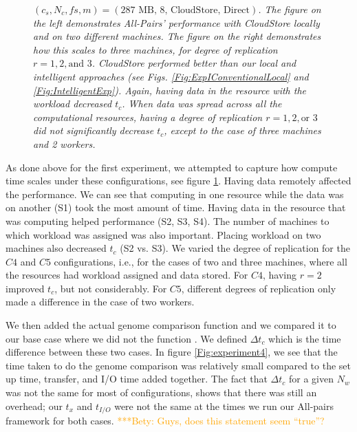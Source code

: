 \documentclass{rspublic}
\newcommand{\micnote}[1]{ {\textcolor{blue} { ***Michael: #1 }}}
\newcommand{\betynote}[1]{ {\textcolor{orange} { ***Bety: #1 }}}
\newcommand{\jhanote}[1]{} \newcommand{\micnote}[1]{}\newcommand{\betynote}[1]{} \newcommand{\fixme}[1]{}
\begin{document}
\begin{figure}
\begin{center}
{\label{Fig:experiment3:b}
}
\caption{\textit{$(c_s, N_c, fs, m) = (\mbox{287 MB, 8, CloudStore,
Direct})$. The figure on the left demonstrates All-Pairs' performance
with CloudStore locally and on two different machines. The figure on the
right demonstrates how this scales to three machines, for degree of
replication $r=1,2,\mbox{and } 3$. CloudStore performed better than our
local and intelligent approaches (see Figs.
\ref{Fig:ExpIConventionalLocal} and \ref{Fig:IntelligentExp}). Again,
having data in the resource with the workload decreased $t_c$. When data
was spread across all the computational resources, having a degree of
replication $r = 1, 2, \mbox{or } 3$ did not significantly decrease
$t_c$, except to the case of three machines and 2 workers.}
\jhanote{This caption needs attention}}
\label{Fig:experiment3}
\end{center}
\end{figure}


As done above for the first experiment, we attempted to capture how
compute time scales under these configurations, see figure
\ref{Fig:experiment3}. Having data remotely affected the performance. We
can see that computing in one resource while the data was on another
(S1) took the most amount of time. Having data in the resource that was
computing helped performance (S2, S3, S4). The number of machines to
which workload was assigned was also important. Placing workload on two
machines also decreased $t_c$ (S2 vs. S3). We varied the degree of
replication for the $C4$ and $C5$ configurations, i.e., for the cases of
two and three machines, where all the resources had workload assigned
and data stored. For $C4$, having $r = 2$ improved $t_c$, but not
considerably. For $C5$, different degrees of replication only made a
difference in the case of two workers.

We then added the actual genome comparison function and we compared it
to our base case where we did not the function . We defined $\Delta t_c$
which is the time difference between these two cases. In figure
\ref{Fig:experiment4}, we see that the time taken to do the genome
comparison was relatively small compared to the set up time, transfer,
and I/O time added together. The fact that $\Delta t_c$ for a given
$N_w$ was not the same for most of configurations, shows that there was
still an overhead; our $t_x$ and $t_{I/O}$ were not the same at the
times we run our All-pairs framework for both cases. \betynote{Guys,
does this statement seem ``true''?}
\end{document}
